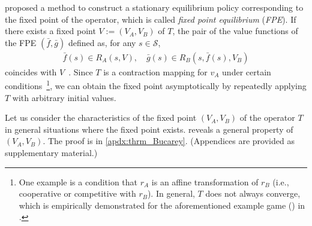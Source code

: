 \documentclass{acml}
\providecommand{\E}{\mathbb{E}} %
\begin{document}
\citet{Bucarey2022-ro} proposed a method to construct a stationary equilibrium policy corresponding to the fixed point of the operator, which is called \emph{fixed point equilibrium} (\emph{FPE}).
If there exists a fixed point $V:=(V_A,V_B)$ of $T$, the pair of the value functions of the FPE $(\bar{f},\bar{g})$ defined as, for any $s \in \mathcal{S}$,
\begin{align*}
	\bar{f}(s)\in R_A(s,V),
	\quad
	\bar{g}(s)\in R_B(s,\bar{f}(s),V_B)
\end{align*}
coincides with $V$~\citep{Bucarey2022-ro}.
Since $T$ is a contraction mapping for $v_A$ under certain conditions~\citep{Bucarey2022-ro}\footnote{One example is a condition that $r_A$ is an affine transformation of $r_B$ (i.e., cooperative or competitive with $r_B$).
In general, $T$ does not always converge, which is empirically demonstrated for the aforementioned example game () in \citet{Jean-Marie2022-td}.}, we can obtain the fixed point asymptotically by repeatedly applying $T$ with arbitrary initial values.

Let us consider the characteristics of the fixed point $(V_A,V_B)$ of the operator $T$ in general situations where the fixed point exists.
 reveals a general property of $(V_A,V_B)$.
The proof is in \cref{apdx:thrm_Bucarey}.
(Appendices are provided as supplementary material.)
\end{document}

